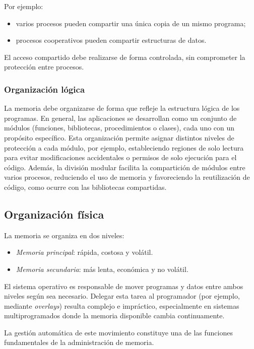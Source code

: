 Por ejemplo:
\begin{itemize}
  \item varios procesos pueden compartir una única copia de un mismo programa;
  \item procesos cooperativos pueden compartir estructuras de datos.
\end{itemize}

El acceso compartido debe realizarse de forma controlada, sin comprometer la protección entre procesos.

\subsubsection{Organización lógica}

La memoria debe organizarse de forma que refleje la estructura lógica de los programas. En general, las aplicaciones se desarrollan como un conjunto de módulos (funciones, bibliotecas, procedimientos o clases), cada uno con un propósito específico. Esta organización permite asignar distintos niveles de protección a cada módulo, por ejemplo, estableciendo regiones de solo lectura para evitar modificaciones accidentales o permisos de solo ejecución para el código. Además, la división modular facilita la compartición de módulos entre varios procesos, reduciendo el uso de memoria y favoreciendo la reutilización de código, como ocurre con las bibliotecas compartidas.

\subsection{Organización física}

La memoria se organiza en dos niveles:
\begin{itemize}
  \item \textit{Memoria principal}: rápida, costosa y volátil.
  \item \textit{Memoria secundaria}: más lenta, económica y no volátil.
\end{itemize}

El sistema operativo es responsable de mover programas y datos entre ambos niveles según sea necesario. Delegar esta tarea al programador (por ejemplo, mediante \textit{overlays}) resulta complejo e impráctico, especialmente en sistemas multiprogramados donde la memoria disponible cambia continuamente.

La gestión automática de este movimiento constituye una de las funciones fundamentales de la administración de memoria.
